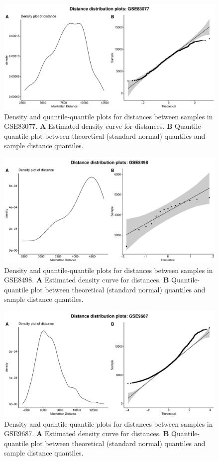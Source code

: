 \documentclass[10pt,letterpaper]{article}\usepackage[]{graphicx}\usepackage[]{color}
\begin{document}
\begin{figure}[H]
	\includegraphics[width=\textwidth]{manhattan-distance_hist_GSE83077.pdf}
	\caption{Density and quantile-quantile plots for distances between samples in GSE83077. \textbf{A} Estimated density curve for distances. \textbf{B} Quantile-quantile plot between theoretical (standard normal) quantiles and sample distance quantiles.}
\end{figure}

\begin{figure}[H]
	\includegraphics[width=\textwidth]{manhattan-distance_hist_GSE8498.pdf}
	\caption{Density and quantile-quantile plots for distances between samples in GSE8498. \textbf{A} Estimated density curve for distances. \textbf{B} Quantile-quantile plot between theoretical (standard normal) quantiles and sample distance quantiles.}
\end{figure}

\begin{figure}[H]
	\includegraphics[width=\textwidth]{manhattan-distance_hist_GSE9687.pdf}
	\caption{Density and quantile-quantile plots for distances between samples in GSE9687. \textbf{A} Estimated density curve for distances. \textbf{B} Quantile-quantile plot between theoretical (standard normal) quantiles and sample distance quantiles.}
\end{figure}
\end{document}
